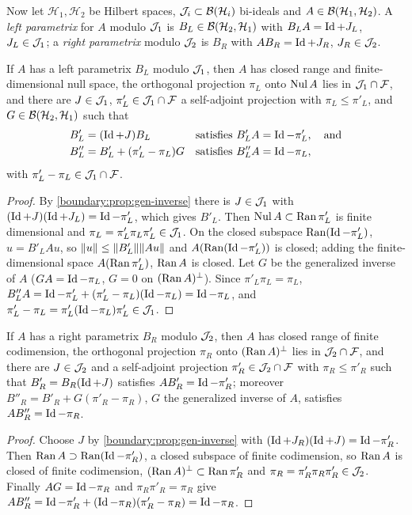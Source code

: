 Now let $\mathcal{H}_1,\mathcal{H}_2$ be Hilbert spaces, $\mathcal{J}_i\subset\mathcal{B}(\mathcal
H_i)$ bi-ideals and $A\in\mathcal{B}(\mathcal H_1,\mathcal H_2)$. A \emph{left parametrix}
for $A$ modulo $\mathcal{J}_1$ is $B_L\in\mathcal{B}(\mathcal H_2,\mathcal H_1)$ with $B_LA=\operatorname{Id}+J_L$,
$J_L\in\mathcal{J}_1$; a \emph{right parametrix} modulo $\mathcal{J}_2$ is $B_R$ with $AB_R=\operatorname{Id}+J_R$,
$J_R\in\mathcal{J}_2$.

\begin{proposition}\label{boundary:prop:left-param}
If $A$ has a left parametrix $B_L$ modulo $\mathcal{J}_1$, then $A$ has closed range and
finite-dimensional null space, the orthogonal projection $\pi_L$ onto $\operatorname{Nul} A$ lies in
$\mathcal{J}_1\cap\mathcal{F}$, and there are $J\in\mathcal{J}_1$, $\pi'_L\in\mathcal{J}_1\cap\mathcal{F}$ a self-adjoint
projection with $\pi_L\le\pi'_L$, and $G\in\mathcal{B}(\mathcal{H}_2,\mathcal{H}_1)$ such that
\begin{align*}
B'_L&=(\Id+J)B_L&&\text{satisfies}\ B'_LA=\Id-\pi'_L,\quad\text{and}\\
B''_L&=B'_L+(\pi'_L-\pi_L)G&&\text{satisfies}\ B''_LA=\Id-\pi_L,
\end{align*}
with $\pi'_L-\pi_L\in\mathcal{J}_1\cap\mathcal{F}$.
\end{proposition}
\begin{proof}
By \cref{boundary:prop:gen-inverse} there is $J\in\mathcal{J}_1$ with $(\operatorname{Id}+J)(\operatorname{Id}+J_L)=
\operatorname{Id}-\pi'_L$, which gives $B'_L$. Then $\operatorname{Nul} A\subset\operatorname{Ran}\pi'_L$ is finite dimensional
and $\pi_L=\pi'_L\pi_L\pi'_L\in\mathcal{J}_1$. On the closed subspace $\operatorname{Ran}(\operatorname{Id}-\pi'_L)$,
$u=B'_LAu$, so $\lVert u\rVert\le\lVert B'_L\rVert\lVert Au\rVert$ and $A(\operatorname{Ran}(\operatorname{Id}-\pi'_L))$ is closed;
adding the finite-dimensional space $A(\operatorname{Ran}\pi'_L)$, $\operatorname{Ran} A$ is closed. Let $G$ be
the generalized inverse of $A$ ($GA=\operatorname{Id}-\pi_L$, $G=0$ on $(\operatorname{Ran} A)^\perp$). Since
$\pi'_L\pi_L=\pi_L$, $B''_LA=\operatorname{Id}-\pi'_L+(\pi'_L-\pi_L)(\operatorname{Id}-\pi_L)=\operatorname{Id}-\pi_L$, and
$\pi'_L-\pi_L=\pi'_L(\operatorname{Id}-\pi_L)\pi'_L\in\mathcal{J}_1$.
\end{proof}

\begin{proposition}\label{boundary:prop:right-param}
If $A$ has a right parametrix $B_R$ modulo $\mathcal{J}_2$, then $A$ has closed range of finite
codimension, the orthogonal projection $\pi_R$ onto $(\operatorname{Ran} A)^\perp$ lies in
$\mathcal{J}_2\cap\mathcal{F}$, and there are $J\in\mathcal{J}_2$ and a self-adjoint projection $\pi'_R\in
\mathcal{J}_2\cap\mathcal{F}$ with $\pi_R\le\pi'_R$ such that $B'_R=B_R(\operatorname{Id}+J)$ satisfies
$AB'_R=\operatorname{Id}-\pi'_R$; moreover $B''_R=B'_R+G(\pi'_R-\pi_R)$, $G$ the generalized inverse
of $A$, satisfies $AB''_R=\operatorname{Id}-\pi_R$.
\end{proposition}
\begin{proof}
Choose $J$ by \cref{boundary:prop:gen-inverse} with $(\operatorname{Id}+J_R)(\operatorname{Id}+J)=\operatorname{Id}-\pi'_R$.
Then $\operatorname{Ran} A\supset\operatorname{Ran}(\operatorname{Id}-\pi'_R)$, a closed subspace of finite codimension, so
$\operatorname{Ran} A$ is closed of finite codimension, $(\operatorname{Ran} A)^\perp\subset\operatorname{Ran}\pi'_R$ and
$\pi_R=\pi'_R\pi_R\pi'_R\in\mathcal{J}_2$. Finally $AG=\operatorname{Id}-\pi_R$ and $\pi_R\pi'_R=\pi_R$ give
$AB''_R=\operatorname{Id}-\pi'_R+(\operatorname{Id}-\pi_R)(\pi'_R-\pi_R)=\operatorname{Id}-\pi_R$.
\end{proof}


